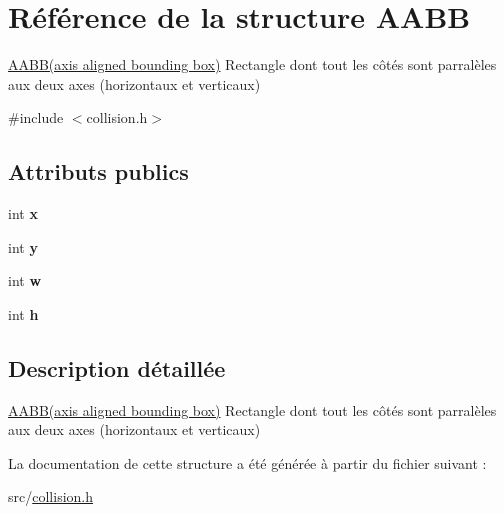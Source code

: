 \hypertarget{struct_a_a_b_b}{\section{Référence de la structure A\+A\+B\+B}
\label{struct_a_a_b_b}
}


\hyperlink{struct_a_a_b_b}{A\+A\+B\+B(axis aligned bounding box)} Rectangle dont tout les côtés sont parralèles aux deux axes (horizontaux et verticaux)  




{\ttfamily \#include $<$collision.\+h$>$}

\subsection*{Attributs publics}
\begin{DoxyCompactItemize}
\item 
\hypertarget{struct_a_a_b_b_a5b8f8f642a267ecffb4f4d80a695cbd3}{int {\bfseries x}}\label{struct_a_a_b_b_a5b8f8f642a267ecffb4f4d80a695cbd3}

\item 
\hypertarget{struct_a_a_b_b_a5683a773fbf63be503f1cb04cccf49a5}{int {\bfseries y}}\label{struct_a_a_b_b_a5683a773fbf63be503f1cb04cccf49a5}

\item 
\hypertarget{struct_a_a_b_b_ab9c7baba7d4a1d002b9d35372401ce43}{int {\bfseries w}}\label{struct_a_a_b_b_ab9c7baba7d4a1d002b9d35372401ce43}

\item 
\hypertarget{struct_a_a_b_b_a390af6ca9f742727209d27b46d840f91}{int {\bfseries h}}\label{struct_a_a_b_b_a390af6ca9f742727209d27b46d840f91}

\end{DoxyCompactItemize}


\subsection{Description détaillée}
\hyperlink{struct_a_a_b_b}{A\+A\+B\+B(axis aligned bounding box)} Rectangle dont tout les côtés sont parralèles aux deux axes (horizontaux et verticaux) 

La documentation de cette structure a été générée à partir du fichier suivant \+:\begin{DoxyCompactItemize}
\item 
src/\hyperlink{collision_8h}{collision.\+h}\end{DoxyCompactItemize}
